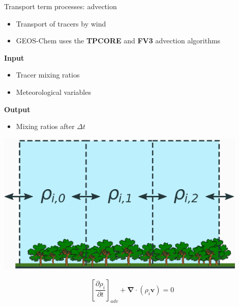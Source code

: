 \documentclass[10pt]{beamer}
\begin{document}
\begin{frame}[fragile]{Transport term processes: advection}
    \begin{minipage}[c]{0.5\textwidth}
        \begin{itemize}
            \item Transport of tracers by wind
            \vspace{0.3cm}
            \item GEOS-Chem uses the \textbf{TPCORE} and \textbf{FV3} advection algorithms
        \end{itemize}
            \vspace{0.5cm}
            \textbf{Input} 
            \begin{itemize}
                \item Tracer mixing ratios
                \item Meteorological variables
            \end{itemize}
            \textbf{Output}
            \begin{itemize}
                \item Mixing ratios after $\Delta t$
            \end{itemize}
    \end{minipage} \hfill
    \begin{minipage}[c]{0.49\textwidth}
    \begin{center}
        \includegraphics[width=0.9\textwidth]{box-model-advection.eps}    
    \end{center}
    \vspace{0.5cm}
    $$
        \left[ \frac{\partial \rho_i}{\partial t} \right]_{adv} + \boldsymbol \nabla \cdot (\rho_i \boldsymbol v) = 0
    $$
    \end{minipage}
\end{frame}
\end{document}
